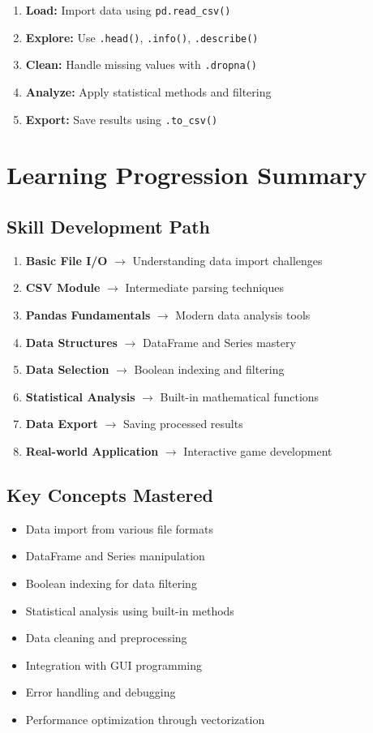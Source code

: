 \documentclass[12pt]{article}
\begin{document}
\begin{enumerate}
    \item \textbf{Load:} Import data using \texttt{pd.read\_csv()}
    \item \textbf{Explore:} Use \texttt{.head()}, \texttt{.info()}, \texttt{.describe()}
    \item \textbf{Clean:} Handle missing values with \texttt{.dropna()}
    \item \textbf{Analyze:} Apply statistical methods and filtering
    \item \textbf{Export:} Save results using \texttt{.to\_csv()}
\end{enumerate}

\section{Learning Progression Summary}

\subsection{Skill Development Path}

\begin{enumerate}
    \item \textbf{Basic File I/O} $\rightarrow$ Understanding data import challenges
    \item \textbf{CSV Module} $\rightarrow$ Intermediate parsing techniques
    \item \textbf{Pandas Fundamentals} $\rightarrow$ Modern data analysis tools
    \item \textbf{Data Structures} $\rightarrow$ DataFrame and Series mastery
    \item \textbf{Data Selection} $\rightarrow$ Boolean indexing and filtering
    \item \textbf{Statistical Analysis} $\rightarrow$ Built-in mathematical functions
    \item \textbf{Data Export} $\rightarrow$ Saving processed results
    \item \textbf{Real-world Application} $\rightarrow$ Interactive game development
\end{enumerate}

\subsection{Key Concepts Mastered}

\begin{itemize}
    \item Data import from various file formats
    \item DataFrame and Series manipulation
    \item Boolean indexing for data filtering
    \item Statistical analysis using built-in methods
    \item Data cleaning and preprocessing
    \item Integration with GUI programming
    \item Error handling and debugging
    \item Performance optimization through vectorization
\end{itemize}
\end{document}
